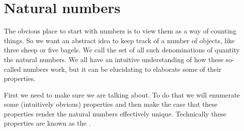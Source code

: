 \chapter{Natural numbers}
The obvious place to start with numbers is to view them as a way of counting things. So we want an abstract idea to keep track of a number of objects, like three sheep or five bagels. We call the set of all such denominations of quantity the natural numbers. We all have an intuitive understanding of how these so-called numbers work, but it can be elucidating to elaborate some of their properties.

First we need to make sure we are talking about. To do that we will enumerate some (intuitively obvious) properties and then make the case that these properties render the natural numbers effectively unique. Technically these properties are known as the .

